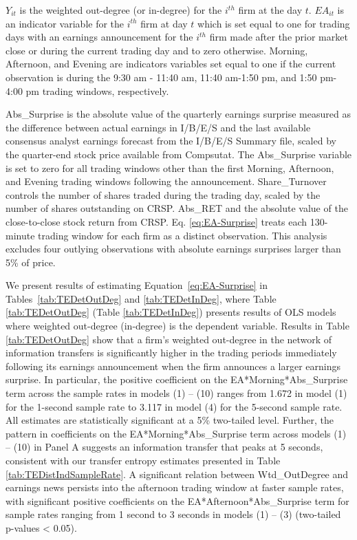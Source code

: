 \noindent \(Y_{it}\) is the weighted out-degree (or in-degree) for the \(i^{th}\) firm at the day \(t\).  \(EA_{it}\) is an indicator variable for the \(i^{th}\) firm at day \(t\)  which is set equal to one for trading days with an earnings announcement for the \(i^{th}\) firm made after the prior market close or during the current trading day and to zero otherwise.   Morning, Afternoon,  and Evening are indicators variables set equal to one if the current observation is during the 9:30 am - 11:40 am, 11:40 am-1:50 pm,  and 1:50 pm-4:00 pm trading windows, respectively.   


Abs\_Surprise is the absolute value of the quarterly earnings surprise measured as the difference between actual earnings in I/B/E/S and the last available consensus analyst earnings forecast from the I/B/E/S Summary file,  scaled by the quarter-end stock price available from Compsutat.  The Abs\_Surprise variable is set to zero for all trading windows other than the first Morning, Afternoon, and Evening trading windows following the announcement.   Share\_Turnover controls the number of shares traded during the trading day, scaled by the number of shares outstanding on CRSP.  Abs\_RET and the absolute value of the close-to-close stock return from CRSP.  Eq. \ref{eq:EA-Surprise} treats each 130-minute trading window for each firm as a distinct observation.  This analysis excludes four outlying observations with absolute earnings surprises larger than 5\% of price.  

We present results of estimating Equation~\ref{eq:EA-Surprise} in Tables~\ref{tab:TEDetOutDeg} and \ref{tab:TEDetInDeg},  where Table \ref{tab:TEDetOutDeg} (Table \ref{tab:TEDetInDeg}) presents results of OLS models where weighted out-degree (in-degree) is the dependent variable.   Results in Table \ref{tab:TEDetOutDeg} show that a firm’s weighted out-degree in the network of information transfers is significantly higher in the trading periods immediately following its earnings announcement when the firm announces a larger earnings surprise. In particular, the positive coefficient on the EA*Morning*Abs\_Surprise term across the sample rates in models (1) – (10) ranges from 1.672 in model (1) for the 1-second sample rate to 3.117 in model (4) for the 5-second sample rate. All estimates are statistically significant at a 5\% two-tailed level.  Further, the pattern in coefficients on the EA*Morning*Abs\_Surprise term across models (1) – (10) in Panel A suggests an information transfer that peaks at 5 seconds, consistent with our transfer entropy estimates presented in Table \ref{tab:TEDistIndSampleRate}.  A significant relation between Wtd\_OutDegree and earnings news persists into the afternoon trading window at faster sample rates, with significant positive coefficients on the EA*Afternoon*Abs\_Surprise term for sample rates ranging from 1 second to 3 seconds in models (1) – (3) (two-tailed p-values < 0.05). 

